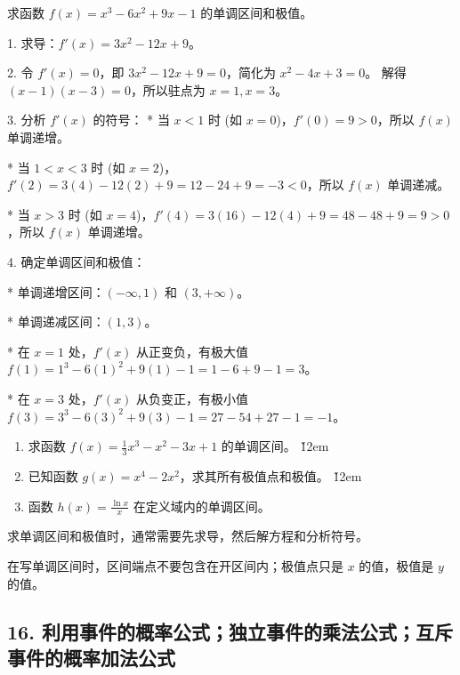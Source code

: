 \begin{example}
    求函数 $f(x) = x^3 - 6x^2 + 9x - 1$ 的单调区间和极值。
\end{example}
\begin{solution}
    1.  求导：$f'(x) = 3x^2 - 12x + 9$。

    2.  令 $f'(x) = 0$，即 $3x^2 - 12x + 9 = 0$，简化为 $x^2 - 4x + 3 = 0$。
    解得 $(x-1)(x-3) = 0$，所以驻点为 $x=1, x=3$。

    3.  分析 $f'(x)$ 的符号：
    * 当 $x < 1$ 时 (如 $x=0$)，$f'(0) = 9 > 0$，所以 $f(x)$ 单调递增。

    * 当 $1 < x < 3$ 时 (如 $x=2$)，$f'(2) = 3(4) - 12(2) + 9 = 12 - 24 + 9 = -3 < 0$，所以 $f(x)$ 单调递减。

    * 当 $x > 3$ 时 (如 $x=4$)，$f'(4) = 3(16) - 12(4) + 9 = 48 - 48 + 9 = 9 > 0$，所以 $f(x)$ 单调递增。

    4.  确定单调区间和极值：

    * 单调递增区间：$(-\infty, 1)$ 和 $(3, +\infty)$。

    * 单调递减区间：$(1, 3)$。

    * 在 $x=1$ 处，$f'(x)$ 从正变负，有极大值 $f(1) = 1^3 - 6(1)^2 + 9(1) - 1 = 1 - 6 + 9 - 1 = 3$。

    * 在 $x=3$ 处，$f'(x)$ 从负变正，有极小值 $f(3) = 3^3 - 6(3)^2 + 9(3) - 1 = 27 - 54 + 27 - 1 = -1$。
\end{solution}

\begin{problem}
\begin{enumerate}
    \item 求函数 $f(x) = \frac{1}{3}x^3 - x^2 - 3x + 1$ 的单调区间。
          \v{12em}
    \item 已知函数 $g(x) = x^4 - 2x^2$，求其所有极值点和极值。
          \v{12em}
    \item 函数 $h(x) = \frac{\ln x}{x}$ 在定义域内的单调区间。
\end{enumerate}
\end{problem}
\begin{tips}
    求单调区间和极值时，通常需要先求导，然后解方程和分析符号。
\end{tips}
\begin{warning}
    在写单调区间时，区间端点不要包含在开区间内；极值点只是 $x$ 的值，极值是 $y$ 的值。
\end{warning}

\subsection*{16. 利用事件的概率公式；独立事件的乘法公式；互斥事件的概率加法公式}

